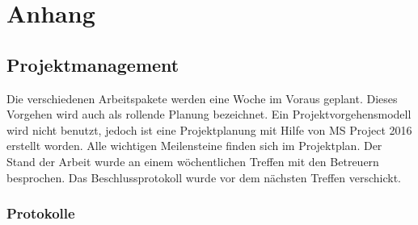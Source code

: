 %
%


\chapter{Anhang}

  \section{Projektmanagement}

    Die verschiedenen Arbeitspakete werden eine Woche im Voraus geplant.
    Dieses Vorgehen wird auch als rollende Planung bezeichnet.
    Ein Projektvorgehensmodell wird nicht benutzt,
    jedoch ist eine Projektplanung mit Hilfe von MS Project 2016 erstellt worden.
    Alle wichtigen Meilensteine finden sich im Projektplan.
    Der Stand der Arbeit wurde an einem wöchentlichen Treffen mit den Betreuern besprochen.
    Das Beschlussprotokoll wurde vor dem nächsten Treffen verschickt.

    \begin{landscape}
      
      
      
    \end{landscape}

    \subsection{Protokolle}

